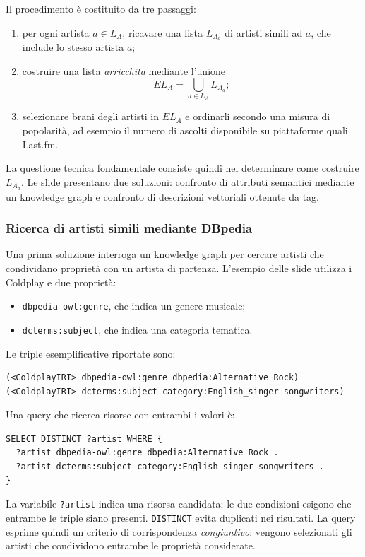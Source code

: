 Il procedimento è costituito da tre passaggi:
\begin{enumerate}
    \item per ogni artista $a\in L_A$, ricavare una lista $L_{A_a}$ di artisti simili ad $a$, che include lo stesso artista $a$;
    \item costruire una lista \emph{arricchita} mediante l'unione
    \[
       EL_A=\bigcup_{a\in L_A} L_{A_a};
    \]
    \item selezionare brani degli artisti in $EL_A$ e ordinarli secondo una misura di popolarità, ad esempio il numero di ascolti disponibile su piattaforme quali Last.fm.
\end{enumerate}
La questione tecnica fondamentale consiste quindi nel determinare come costruire $L_{A_a}$. Le slide presentano due soluzioni: confronto di attributi semantici mediante un knowledge graph e confronto di descrizioni vettoriali ottenute da tag.

\subsubsection{Ricerca di artisti simili mediante DBpedia}
Una prima soluzione interroga un knowledge graph per cercare artisti che condividano proprietà con un artista di partenza. L'esempio delle slide utilizza i Coldplay e due proprietà:
\begin{itemize}
    \item \texttt{dbpedia-owl:genre}, che indica un genere musicale;
    \item \texttt{dcterms:subject}, che indica una categoria tematica.
\end{itemize}
Le triple esemplificative riportate sono:
\begin{verbatim}
(<ColdplayIRI> dbpedia-owl:genre dbpedia:Alternative_Rock)
(<ColdplayIRI> dcterms:subject category:English_singer-songwriters)
\end{verbatim}
Una query che ricerca risorse con entrambi i valori è:
\begin{verbatim}
SELECT DISTINCT ?artist WHERE {
  ?artist dbpedia-owl:genre dbpedia:Alternative_Rock .
  ?artist dcterms:subject category:English_singer-songwriters .
}
\end{verbatim}
La variabile \texttt{?artist} indica una risorsa candidata; le due condizioni esigono che entrambe le triple siano presenti. \texttt{DISTINCT} evita duplicati nei risultati. La query esprime quindi un criterio di corrispondenza \emph{congiuntivo}: vengono selezionati gli artisti che condividono entrambe le proprietà considerate.

